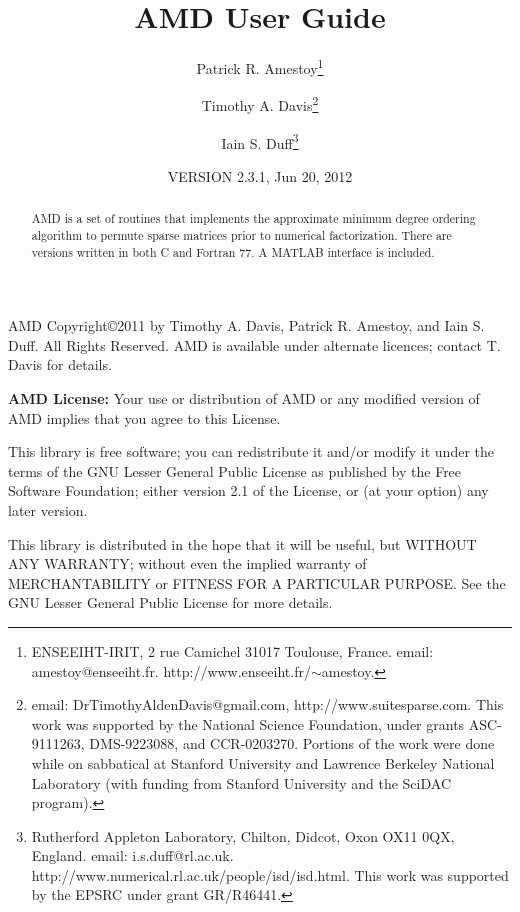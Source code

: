 \documentclass[11pt]{article}
\begin{document}

\title{AMD User Guide}
\author{Patrick R. Amestoy\thanks{ENSEEIHT-IRIT,
2 rue Camichel 31017 Toulouse, France.
email: amestoy@enseeiht.fr.  http://www.enseeiht.fr/$\sim$amestoy.}
\and Timothy A. Davis\thanks{
email: DrTimothyAldenDavis@gmail.com,
http://www.suitesparse.com.
This work was supported by the National
Science Foundation, under grants ASC-9111263, DMS-9223088, and CCR-0203270.
Portions of the work were done while on sabbatical at Stanford University
and Lawrence Berkeley National Laboratory (with funding from Stanford
University and the SciDAC program).
}
\and Iain S. Duff\thanks{Rutherford Appleton Laboratory, Chilton, Didcot, 
Oxon OX11 0QX, England. email: i.s.duff@rl.ac.uk.  
http://www.numerical.rl.ac.uk/people/isd/isd.html.
This work was supported by the EPSRC under grant GR/R46441.
}}

\date{VERSION 2.3.1, Jun 20, 2012}
\maketitle

\begin{abstract}
AMD is a set of routines that implements the approximate minimum degree ordering
algorithm to permute sparse matrices prior to
numerical factorization.
There are versions written in both C and Fortran 77.
A MATLAB interface is included.
\end{abstract}

AMD Copyright\copyright 2011 by Timothy A.
Davis, Patrick R. Amestoy, and Iain S. Duff.  All Rights Reserved.
AMD is available under alternate licences; contact T. Davis for details.

{\bf AMD License:}
    Your use or distribution of AMD or any modified version of
    AMD implies that you agree to this License.

    This library is free software; you can redistribute it and/or
    modify it under the terms of the GNU Lesser General Public
    License as published by the Free Software Foundation; either
    version 2.1 of the License, or (at your option) any later version.

    This library is distributed in the hope that it will be useful,
    but WITHOUT ANY WARRANTY; without even the implied warranty of
    MERCHANTABILITY or FITNESS FOR A PARTICULAR PURPOSE.  See the GNU
    Lesser General Public License for more details.
\end{document}

